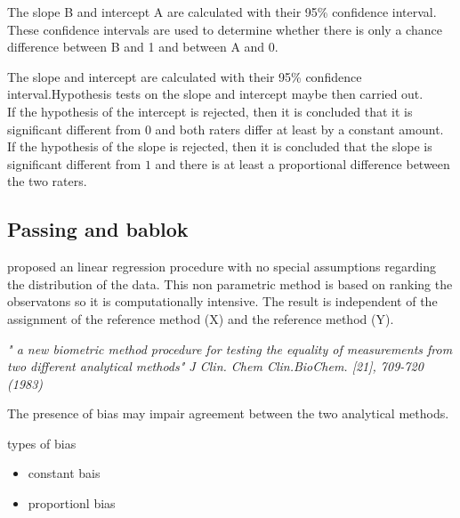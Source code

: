 \documentclass[MAIN.tex]{subfiles}
\begin{document}
The slope B and intercept A are calculated with their 95\% confidence interval. These confidence intervals are used to determine whether there is only a chance difference between B and 1 and between A and 0.


 The slope and intercept  are calculated with their 95\% confidence interval.Hypothesis tests on the slope and intercept maybe then
carried out.\\

If the hypothesis of the intercept is rejected, then it is concluded that it is significant different from $0$ and both
raters differ at least by a constant amount.
	\\
If the hypothesis of the slope is rejected, then it is concluded that the slope is significant different from $1$ and there is at
least a proportional difference between the two raters.




\subsection{Passing and bablok}
proposed an linear regression procedure with no special assumptions regarding the distribution of the data.
This non parametric method is based on ranking the observatons so it is computationally intensive.
The result is independent of the assignment of the reference method (X) and the reference method (Y).

\textit{" a new biometric method procedure for testing the equality of measurements from two different analytical methods"
J Clin. Chem Clin.BioChem. [21], 709-720 (1983)}

The presence of bias may impair agreement between the two analytical methods.

types of bias

\begin{itemize}
	\item constant bais
	\item proportionl bias
\end{itemize}










\end{document}
